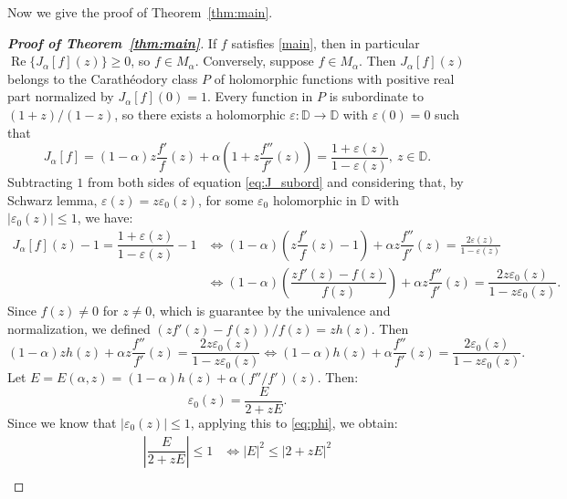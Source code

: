 \documentclass[reqno]{amsart}
\theoremstyle{plain}
\theoremstyle{definition}
\newcommand{\D}{\mathbb{D}}
\begin{document}
Now we give the proof of Theorem~\ref{thm:main}.
\begin{proof}[\textbf{Proof of Theorem~\ref{thm:main}}]
If $f$ satisfies \eqref{main}, then in particular $\operatorname{Re}\{J_\alpha[f](z)\} \geq 0$, so $f \in M_\alpha$. Conversely, suppose $f \in M_\alpha$. Then $J_\alpha[f](z)$ belongs to the Carath\'eodory class $P$ of holomorphic functions with positive real part normalized by $J_\alpha[f](0) = 1$. Every function in $P$
is subordinate to $(1+z)/(1-z)$, so there exists a holomorphic
$\varepsilon \colon \mathbb{D} \to \mathbb{D}$ with $\varepsilon(0) = 0$ such that
\begin{equation}\label{eq:J_subord}
J_\alpha[f]=(1-\alpha)z\dfrac{f'}{f}(z)+\alpha\left(1+z\dfrac{f''}{f'}(z)\right)=\dfrac{1+\varepsilon(z)}{1-\varepsilon(z)},\ z\in \D.
\end{equation}
Subtracting $1$ from both sides of equation \eqref{eq:J_subord} and considering that, by Schwarz lemma, $\varepsilon(z)=z\varepsilon_0(z)$, for some $\varepsilon_0$ holomorphic in $\D$ with $|\varepsilon_0(z)|\leq 1$, we have:
\begin{align*}
J_\alpha[f](z)-1=\dfrac{1+\varepsilon(z)}{1-\varepsilon(z)}-1 & \Leftrightarrow (1-\alpha)\left(z\dfrac{f'}{f}(z)-1\right)+\alpha z\dfrac{f''}{f'}(z)=\frac{2\varepsilon(z)}{1-\varepsilon(z)}\\
& \Leftrightarrow (1-\alpha)\left(\dfrac{zf'(z)-f(z)}{f(z)}\right)+\alpha z\dfrac{f''}{f'}(z)=\dfrac{2z\varepsilon_0(z)}{1-z\varepsilon_0(z)}.
\end{align*}
Since $f(z)\neq 0$ for $z\neq 0$, which is guarantee by the univalence and normalization, we defined $(zf'(z)-f(z))/f(z)=zh(z)$. Then
    \begin{equation*}
        (1-\alpha)zh(z)+\alpha z\dfrac{f''}{f'}(z)=\dfrac{2z\varepsilon_0(z)}{1-z\varepsilon_0(z)}\Leftrightarrow (1-\alpha) h(z)+\alpha\dfrac{f''}{f'}(z)=\dfrac{2\varepsilon_0(z)}{1-z\varepsilon_0(z)}.
    \end{equation*}
    Let $E=E(\alpha,z)=(1-\alpha)h(z)+\alpha (f''/f')(z)$. Then:
    \begin{equation}\label{eq:phi}
      \varepsilon_0(z)=\dfrac{E}{2+zE}.
    \end{equation}
    Since we know that $\lvert\varepsilon_0(z)\rvert\leq 1$, applying this to \eqref{eq:phi}, we obtain:
    \begin{align*}
        \left\lvert\dfrac{E}{2+zE}\right\rvert\leq 1 & \Leftrightarrow \lvert E\rvert^2\leq\lvert 2+zE\rvert^2\\

\end{align*}
\end{proof}
\end{document}
